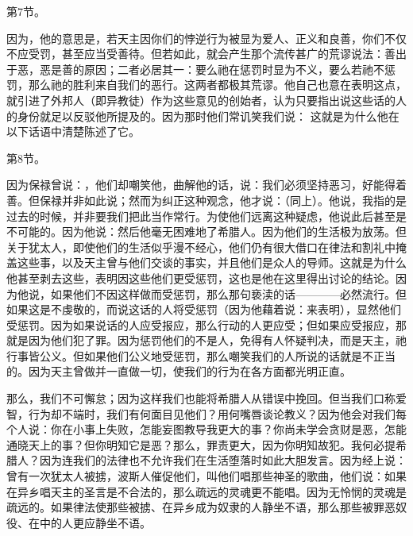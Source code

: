 第7节。 \par

因为，他的意思是，若天主因你们的悖逆行为被显为爱人、正义和良善，你们不仅不应受罚，甚至应当受善待。但若如此，就会产生那个流传甚广的荒谬说法：善出于恶，恶是善的原因；二者必居其一：要么祂在惩罚时显为不义，要么若祂不惩罚，那么祂的胜利来自我们的恶行。这两者都极其荒谬。他自己也意在表明这点，就引进了外邦人（即异教徒）作为这些意见的创始者，认为只要指出说这些话的人的身份就足以反驳他所提及的。因为那时他们常讥笑我们说： 这就是为什么他在以下话语中清楚陈述了它。\par

第8节。 \par

因为保禄曾说：，他们却嘲笑他，曲解他的话，说：我们必须坚持恶习，好能得着善。但保禄并非如此说；然而为纠正这种观念，他才说：（同上）。他说，我指的是过去的时候，并非要我们把此当作常行。为使他们远离这种疑虑，他说此后甚至是不可能的。因为他说：然后他毫无困难地了希腊人。因为他们的生活极为放荡。但关于犹太人，即使他们的生活似乎漫不经心，他们仍有很大借口在律法和割礼中掩盖这些事，以及天主曾与他们交谈的事实，并且他们是众人的导师。这就是为什么他甚至剥去这些，表明因这些他们更受惩罚，这也是他在这里得出讨论的结论。因为他说，如果他们不因这样做而受惩罚，那么那句亵渎的话————必然流行。但如果这是不虔敬的，而说这话的人将受惩罚（因为他藉着说：来表明），显然他们受惩罚。因为如果说话的人应受报应，那么行动的人更应受；但如果应受报应，那就是因为他们犯了罪。因为惩罚他们的不是人，免得有人怀疑判决，而是天主，祂行事皆公义。但如果他们公义地受惩罚，那么嘲笑我们的人所说的话就是不正当的。因为天主曾做并一直做一切，使我们的行为在各方面都光明正直。\par

那么，我们不可懈怠；因为这样我们也能将希腊人从错误中挽回。但当我们口称爱智，行为却不端时，我们有何面目见他们？用何嘴唇谈论教义？因为他会对我们每个人说：你在小事上失败，怎能妄图教导我更大的事？你尚未学会贪财是恶，怎能通晓天上的事？但你明知它是恶？那么，罪责更大，因为你明知故犯。我何必提希腊人？因为连我们的法律也不允许我们在生活堕落时如此大胆发言。因为经上说：曾有一次犹太人被掳，波斯人催促他们，叫他们唱那些神圣的歌曲，他们说：如果在异乡唱天主的圣言是不合法的，那么疏远的灵魂更不能唱。因为无怜悯的灵魂是疏远的。如果律法使那些被掳、在异乡成为奴隶的人静坐不语，那么那些被罪恶奴役、在中的人更应静坐不语。\par

